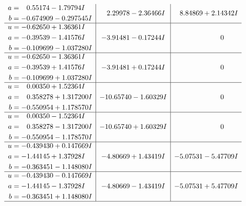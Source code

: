 \documentclass[1p]{elsarticle_modified}
\theoremstyle{definition}
\begin{document}
$$\begin{array}{c|c|c}
\begin{aligned}
a &= \phantom{-}0.55174 - 1.79794 I \\
b &= -0.674909 - 0.297545 I\end{aligned}
 & \phantom{-}2.29978 - 2.36466 I & \phantom{-}8.84869 + 2.14342 I \\ \hline\begin{aligned}
u &= -0.62650 + 1.36361 I \\
a &= -0.39539 - 1.41576 I \\
b &= -0.109699 - 1.037280 I\end{aligned}
 & -3.91481 - 0.17244 I & \phantom{-0.000000 } 0 \\ \hline\begin{aligned}
u &= -0.62650 - 1.36361 I \\
a &= -0.39539 + 1.41576 I \\
b &= -0.109699 + 1.037280 I\end{aligned}
 & -3.91481 + 0.17244 I & \phantom{-0.000000 } 0 \\ \hline\begin{aligned}
u &= \phantom{-}0.00350 + 1.52364 I \\
a &= \phantom{-}0.358278 + 1.317200 I \\
b &= -0.550954 + 1.178570 I\end{aligned}
 & -10.65740 - 1.60329 I & \phantom{-0.000000 } 0 \\ \hline\begin{aligned}
u &= \phantom{-}0.00350 - 1.52364 I \\
a &= \phantom{-}0.358278 - 1.317200 I \\
b &= -0.550954 - 1.178570 I\end{aligned}
 & -10.65740 + 1.60329 I & \phantom{-0.000000 } 0 \\ \hline\begin{aligned}
u &= -0.439430 + 0.147669 I \\
a &= -1.44145 + 1.37928 I \\
b &= -0.363451 - 1.148080 I\end{aligned}
 & -4.80669 + 1.43419 I & -5.07531 - 5.47709 I \\ \hline\begin{aligned}
u &= -0.439430 - 0.147669 I \\
a &= -1.44145 - 1.37928 I \\
b &= -0.363451 + 1.148080 I\end{aligned}
 & -4.80669 - 1.43419 I & -5.07531 + 5.47709 I\\
 \hline 
 \end{array}$$\newpage$$\begin{array}{c|c|c}  

\end{array}$$
\end{document}
